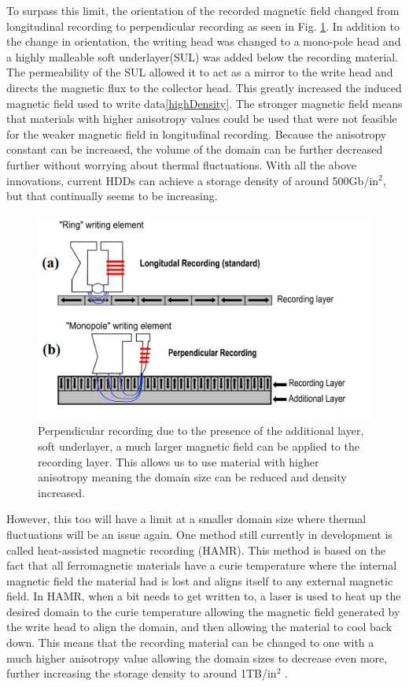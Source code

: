 \documentclass[ notitlepage, numerical, 11pt]{revtex4-1} %
\begin{document}
To surpass this limit, the orientation of the recorded magnetic field changed from longitudinal recording to perpendicular recording as seen in Fig. \ref{perpendicularComparison}. In addition to the change in orientation, the writing head was changed to a mono-pole head and a highly malleable soft underlayer(SUL) was added below the recording material. The permeability of the SUL allowed it to act as a mirror to the write head and directs the magnetic flux to the collector head. This greatly increased the induced magnetic field used to write data\ref{highDensity}. The stronger magnetic field means that materials with higher anisotropy values could be used that were not feasible for the weaker magnetic field in longitudinal recording. Because the anisotropy constant can be increased, the volume of the domain can be further decreased further without worrying about thermal fluctuations. With all the above innovations, current HDDs can achieve a storage density of around 500Gb/in$^2$, but that continually seems to be increasing.

\begin{figure}[H]
\centerline{\includegraphics[scale=.45]{perpendicularComparison.png}}
\caption{Perpendicular recording due to the presence of the additional layer, soft underlayer, a much larger magnetic field can be applied to the recording layer. This allows us to use material with higher anisotropy meaning the domain size can be reduced and density increased.}
\label{perpendicularComparison}
\end{figure}


However, this too will have a limit at a smaller domain size where thermal fluctuations will be an issue again. One method still currently in development is called heat-assisted magnetic recording (HAMR). This method is based on the fact that all ferromagnetic materials have a curie temperature where the internal magnetic field the material had is lost and aligns itself to any external magnetic field. In HAMR, when a bit needs to get written to, a laser is used to heat up the desired domain to the curie temperature allowing the magnetic field generated by the write head to align the domain, and then allowing the material to cool back down. This means that the recording material can be changed to one with a much higher anisotropy value allowing the domain sizes to decrease even more, further increasing the storage density to around 1TB/in$^2$ \cite{hamr}. 
\end{document}

